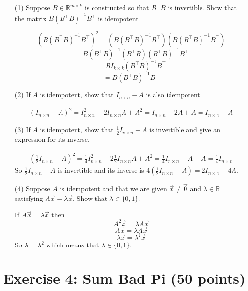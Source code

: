 \begin{itemize}
\item[(1)] Suppose $B \in \mathds{R}^{m \times k}$ is constructed so that $B^\top B$ is invertible. Show that the matrix $B(B^\top B)^{-1} B^\top$ is idempotent.

  \begin{correction}
$$(B(B^\top B)^{-1} B^\top)^2 = (B(B^\top B)^{-1} B^\top)(B(B^\top B)^{-1} B^\top) $$
$$= B(B^\top B)^{-1} (B^\top B)(B^\top B)^{-1} B^\top$$
$$              =  B I_{k \times k}(B^\top B)^{-1} B^\top$$
$$= B(B^\top B)^{-1} B^\top$$
\end{correction}
\item[(2)] If $A$ is idempotent, show that $I_{n\times n} - A$ is also idempotent.
 \begin{correction}
\begin{multline*}
 (I_{n\times n} - A)^2 = I_{n\times n}^2 - 2I_{n\times n}A + A^2 = I_{n\times n} - 2A + A = I_{n\times n} - A
      \end{multline*}                             
\end{correction}

\item[(3)] If $A$ is idempotent, show that $\frac{1}{2} I_{n\times n} - A$ is invertible and give an expression for its inverse.
\begin{correction}
\begin{multline*}
 (\frac{1}{2}I_{n\times n} - A)^2 = \frac{1}{4}I_{n\times n}^2 - 2\frac{1}{2}I_{n\times n}A + A^2 = \frac{1}{4}I_{n\times n} - A + A = \frac{1}{4}I_{n\times n}
      \end{multline*}
      So $\frac{1}{2}I_{n\times n} - A$ is invertible and its inverse is $4(\frac{1}{2}I_{n\times n} - A) = 2I_{n\times n} - 4A$.
\end{correction}
\item[(4)] Suppose $A$ is idempotent and that we are given $\vec{x} \neq \vec{0}$ and $\lambda \in  \mathds{R}$ satisfying $A\vec{x} = \lambda\vec{x}$. Show that $\lambda \in \{0, 1\}$.
   \begin{correction}
   If $A\vec{x} = \lambda\vec{x}$ then
   $$A^2\vec{x} = \lambda A\vec{x}$$
   $$A\vec{x} = \lambda A\vec{x}$$
   $$\lambda\vec{x}  = \lambda^2\vec{x}$$
   So $\lambda = \lambda^2$ which means that $\lambda \in \{0, 1\}$.
\end{correction}   
\end{itemize}

\section{Exercise 4: Sum Bad Pi  \normalsize \textnormal(50 points)}

